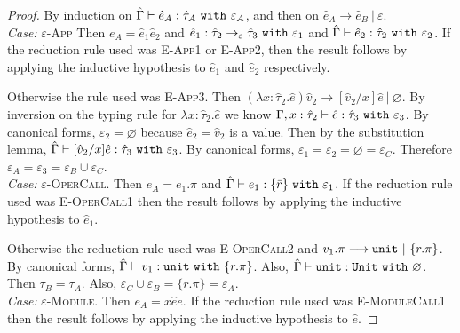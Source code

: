 \begin{proof} By induction on $\hat \Gamma \vdash \hat e_A: \hat \tau_A~\mathtt{with}~ \varepsilon_A$, and then on $\hat e_A \longrightarrow \hat e_B~|~\varepsilon$. \\

\textit{Case:} \textsc{$\varepsilon$-App} Then $e_A = \hat e_1 \hat e_2$ and $\hat e_1: \hat \tau_2 \rightarrow_{\varepsilon} \hat \tau_3~\mathtt{with}~ \varepsilon_1$ and $\hat \Gamma \vdash \hat e_2: \hat \tau_2~\mathtt{with}~ \varepsilon_2$. If the reduction rule used was \textsc{E-App1} or \textsc{E-App2}, then the result follows by applying the inductive hypothesis to $\hat e_1$ and $\hat e_2$ respectively.

Otherwise the rule used was \textsc{E-App3}. Then $(\lambda x: \hat \tau_2.\hat e)\hat v_2 \longrightarrow [\hat v_2/x]\hat e~|~\varnothing$. By inversion on the typing rule for $\lambda x: \hat \tau_2.\hat e$ we know $\Gamma, x: \hat \tau_2 \vdash \hat e: \hat \tau_3~\mathtt{with}~ \varepsilon_3$. By canonical forms, $\varepsilon_2 = \varnothing$ because $\hat e_2 = \hat v_2$ is a value. Then by the substitution lemma, $\hat \Gamma \vdash [\hat v_2/x]\hat e : \hat \tau_3~\mathtt{with}~ \varepsilon_3$. By canonical forms, $\varepsilon_1 = \varepsilon_2 = \varnothing = \varepsilon_C$. Therefore $\varepsilon_A = \varepsilon_3 = \varepsilon_B \cup \varepsilon_C$.\\

\textit{Case:} \textsc{$\varepsilon$-OperCall}. Then $e_A = e_1.\pi$ and $\hat \Gamma \vdash e_1 : \{ \bar r \}~\mathtt{with}~ \varepsilon_1$. If the reduction rule used was \textsc{E-OperCall1} then the result follows by applying the inductive hypothesis to $\hat e_1$.

Otherwise the reduction rule used was \textsc{E-OperCall2} and $v_1.\pi \longrightarrow \mathtt{unit}~|~\{ r.\pi \}$. By canonical forms, $\hat \Gamma \vdash v_1: \mathtt{unit}~\mathtt{with}~ \{ r.\pi \}$. Also, $\hat \Gamma \vdash \mathtt{unit}: \mathtt{Unit}~\mathtt{with}~ \varnothing$. Then $\tau_B = \tau_A$. Also, $\varepsilon_C \cup \varepsilon_B = \{ r.\pi \} = \varepsilon_A$.\\

\textit{Case:} \textsc{$\varepsilon$-Module}. Then $e_A = {x}{\hat e}{e}$. If the reduction rule used was \textsc{E-ModuleCall1} then the result follows by applying the inductive hypothesis to $\hat e$.


\end{proof}
